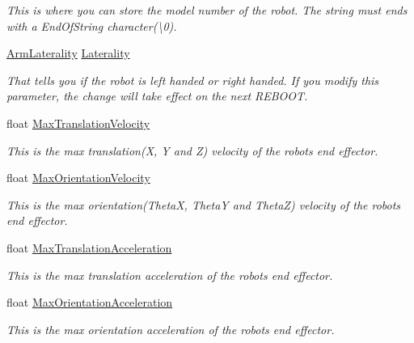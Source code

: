 \begin{DoxyCompactItemize}
\begin{DoxyCompactList}\small\item\em This is where you can store the model number of the robot. The string must ends with a End\+Of\+String character(\textbackslash{}0). \end{DoxyCompactList}\item 
\hyperlink{_kinova_types_8h_a3b88714e308595eb42f64c56259a1ccf}{Arm\+Laterality} \hyperlink{struct_client_configurations_ac5eae96db1727c1330a987f49acadb0f}{Laterality}
\begin{DoxyCompactList}\small\item\em That tells you if the robot is left handed or right handed. If you modify this parameter, the change will take effect on the next R\+E\+B\+O\+OT. \end{DoxyCompactList}\item 
float \hyperlink{struct_client_configurations_a85ae51f1716500dd154f0ce279b78a47}{Max\+Translation\+Velocity}
\begin{DoxyCompactList}\small\item\em This is the max translation(\+X, Y and Z) velocity of the robot\textquotesingle{}s end effector. \end{DoxyCompactList}\item 
float \hyperlink{struct_client_configurations_a238936e76488a26a5f816413cd25977e}{Max\+Orientation\+Velocity}
\begin{DoxyCompactList}\small\item\em This is the max orientation(\+Theta\+X, Theta\+Y and Theta\+Z) velocity of the robot\textquotesingle{}s end effector. \end{DoxyCompactList}\item 
float \hyperlink{struct_client_configurations_a787ef22ca55cd38c04f171b885eccffc}{Max\+Translation\+Acceleration}
\begin{DoxyCompactList}\small\item\em This is the max translation acceleration of the robot\textquotesingle{}s end effector. \end{DoxyCompactList}\item 
float \hyperlink{struct_client_configurations_a6dd1f0fa61310ae5c7c090b4f203b8a0}{Max\+Orientation\+Acceleration}
\begin{DoxyCompactList}\small\item\em This is the max orientation acceleration of the robot\textquotesingle{}s end effector. \end{DoxyCompactList}\item 

\end{DoxyCompactItemize}
